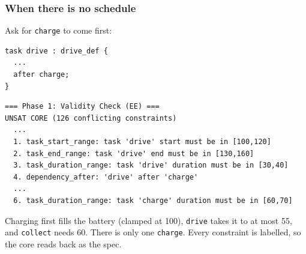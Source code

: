 \begin{frame}[fragile]
  \frametitle{When there is no schedule} \small

Ask for {\tt charge} to come first:

\begin{lstlisting}
task drive : drive_def {
  ...
  after charge;
}
\end{lstlisting}

\begin{lstlisting}[style=shell,basicstyle=\ttfamily\tiny]
=== Phase 1: Validity Check (EE) ===
UNSAT CORE (126 conflicting constraints)
  ...
  1. task_start_range: task 'drive' start must be in [100,120]
  2. task_end_range: task 'drive' end must be in [130,160]
  3. task_duration_range: task 'drive' duration must be in [30,40]
  4. dependency_after: 'drive' after 'charge'
  ...
  6. task_duration_range: task 'charge' duration must be in [60,70]
\end{lstlisting}

Charging first fills the battery (clamped at 100), {\tt drive} takes it to at most 55, and
{\tt collect} needs 60. There is only one {\tt charge}. Every constraint is labelled, so the
core reads back as the spec.

\end{frame}
